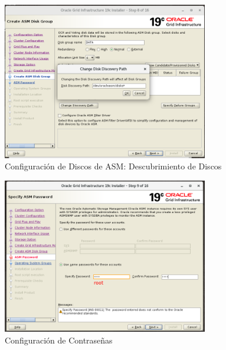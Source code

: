 \documentclass{article}
\begin{document}
\begin{figure}[H]
		\begin{center}
			\includegraphics[width=0.80\textwidth]{grid_install_08_create_asm_group_change_discovery_path.png}
		\end{center}
		\caption{Configuración de Discos de ASM: Descubrimiento de Discos}
\end{figure}

\begin{figure}[H]
		\begin{center}
			\includegraphics[width=0.80\textwidth]{grid_install_09_ASM_password.png}
		\end{center}
		\caption{Configuración de Contraseñas}
\end{figure}
\end{document}
